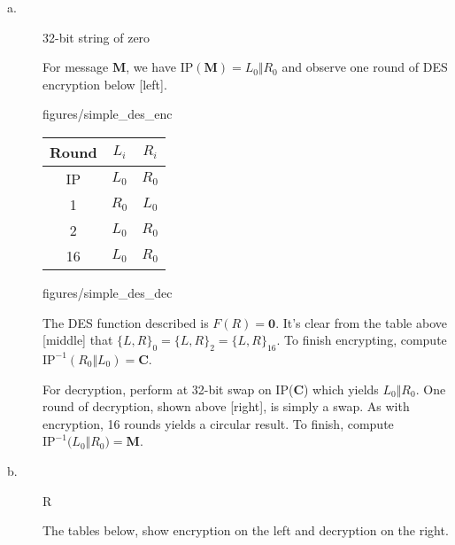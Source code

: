 \documentclass[../hw_sols.tex]{subfiles}
\begin{document}
\begin{description}

\item[a.] 32-bit string of zero

\begin{solution}

For message $\mathbf{M}$, we have IP$(\mathbf{M}) = L_0 \Vert R_0$ and 
observe one round of DES encryption below [left].

\begin{multicols}{3}
	\hfill   %
	
		{figures/simple_des_enc}

	\begin{center}
	\begin{tabular}{ c | c | c }
		\textbf{Round} & $L_i$ & $R_i$ \\[2pt]  %
		\hline
		IP & $L_0$ & $R_0$ \\[5pt]
		 1 & $R_0$ & $L_0$ \\[5pt]
		 2 & $L_0$ & $R_0$ \\[5pt]
		16 & $L_0$ & $R_0$ \\[5pt]
	\end{tabular}
	\end{center}

	
		{figures/simple_des_dec}
\end{multicols}

\vspace{-0.25cm}
The DES function described is $F(R) = \mathbf{0}$. It's clear from the table 
above [middle] that \newline 
$\{L,R\}_0 = \{L,R\}_2 = \{L,R\}_{16}$. 
To finish encrypting, compute 
$\text{IP}^{-1}(R_0 \Vert L_0) = \mathbf{C}$.

For decryption, perform at 32-bit swap on IP($\mathbf{C}$) which yields 
$L_0 \Vert R_0$. One round of decryption, shown above [right], is simply a 
swap. As with encryption, 16 rounds yields a circular result. To finish, 
compute $\text{IP}^{-1}\big( L_0 \Vert R_0 \big) = \textbf{M}$.

\end{solution}

\item[b.] R

\begin{solution}

The tables below, show encryption on the left and decryption on the right.


\end{solution}
\end{description}
\end{document}
